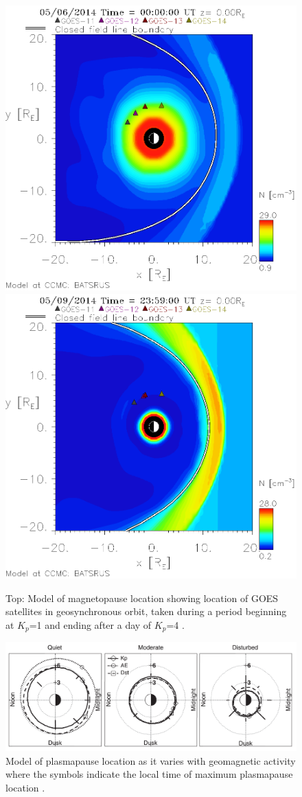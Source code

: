 \begin{figure}[htp!]
	\centering
	\includegraphics[width=0.7\linewidth]{Figures/idl_798387073825_050215_2_20140506_000000_before}
	\includegraphics[width=0.7\linewidth]{Figures/idl_798605093993_050215_2_20140509_235900_after}
	\caption{Top: Model of magnetopause location showing location of GOES satellites in geosynchronous orbit, taken during a period beginning at $K_p$=1 and ending after a day of $K_p$=4 \citep{CCMC}. }
	\label{fig:PlasmapauseLocationCCMC}
\end{figure}

\begin{figure}[htp!]
	\centering
	\includegraphics[width=0.9\linewidth]{Figures/PlasmapauseLocation.png}
	\caption{Model of plasmapause location as it varies with geomagnetic activity where the symbols indicate the local time of maximum plasmapause location \citep{OBrien2003EmpiricalPlasmapause}.}
	\label{fig:PlasmapauseLocation}
\end{figure}

